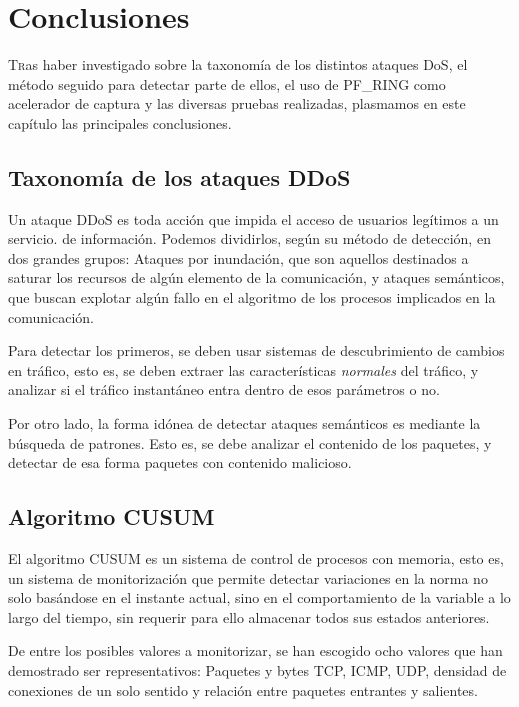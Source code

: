 \chapter{Conclusiones}
\pagestyle{esitscCD}

\lettrine[lraise=-0.1, lines=2, loversize=0.25]{T}ras haber investigado sobre la taxonomía de los distintos ataques 
\gls{DoS}, el método seguido para detectar parte de ellos, el uso de PF\_RING como acelerador de captura y las diversas 
pruebas realizadas, plasmamos en este capítulo las principales conclusiones.

\section{Taxonomía de los ataques DDoS}
Un ataque \gls{DDoS} es toda acción que impida el acceso de usuarios legítimos a un servicio. de información. Podemos 
dividirlos, según su método de detección, en dos grandes grupos: Ataques por inundación, que son aquellos destinados a 
saturar los recursos de algún elemento de la comunicación, y ataques semánticos, que buscan explotar algún fallo en el 
algoritmo de los procesos implicados en la comunicación.

Para detectar los primeros, se deben usar sistemas de descubrimiento de cambios en tráfico, esto es, se deben extraer 
las características \emph{normales} del tráfico, y analizar si el tráfico instantáneo entra dentro de esos parámetros o 
no.

Por otro lado, la forma idónea de detectar ataques semánticos es mediante la búsqueda de patrones. Esto es, se debe
analizar el contenido de los paquetes, y detectar de esa forma paquetes con contenido malicioso.

\section{Algoritmo CUSUM}
El algoritmo CUSUM es un sistema de control de procesos con memoria, esto es, un sistema de monitorización que permite 
detectar variaciones en la norma no solo basándose en el instante actual, sino en el comportamiento de la variable a lo 
largo del tiempo, sin requerir para ello almacenar todos sus estados anteriores.

De entre los posibles valores a monitorizar, se han escogido ocho valores que han demostrado ser representativos: 
Paquetes y bytes TCP, ICMP, UDP, densidad de conexiones de un solo sentido y relación entre paquetes entrantes y 
salientes.


